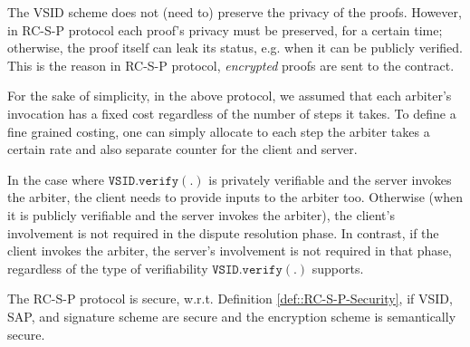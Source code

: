 \begin{remark} The VSID scheme  does not (need to) preserve the privacy of the proofs. However, in RC-S-P  protocol  each proof's privacy must be preserved, for a certain time; otherwise, the proof itself can leak its status, e.g. when it can be publicly verified. This is the reason in RC-S-P protocol,  \emph{encrypted} proofs are sent to the contract.   
\end{remark}


\begin{remark}
For the sake of simplicity, in the above protocol, we assumed that each arbiter's invocation has a fixed  cost regardless of the number of steps it takes. To define a fine grained costing, one can simply allocate to each step the arbiter takes a certain rate and also separate counter  for the client and server.  
\end{remark}

\begin{remark}
In the case where $\mathtt{VSID.verify}(.)$ is privately verifiable and    the server invokes the arbiter, the client needs to provide inputs to the arbiter too. Otherwise (when it is publicly verifiable and  the server invokes the arbiter), the client's involvement is not required in the dispute resolution phase.  In contrast, if the client invokes the arbiter, the server's involvement is not required in that phase, regardless of the type of verifiability $\mathtt{VSID.verify}(.)$ supports. 
\end{remark}




\begin{theorem}
The RC-S-P protocol is secure, w.r.t. Definition \ref{def::RC-S-P-Security}, if VSID, SAP, and signature scheme are secure and the encryption scheme is semantically secure. 
\end{theorem}



